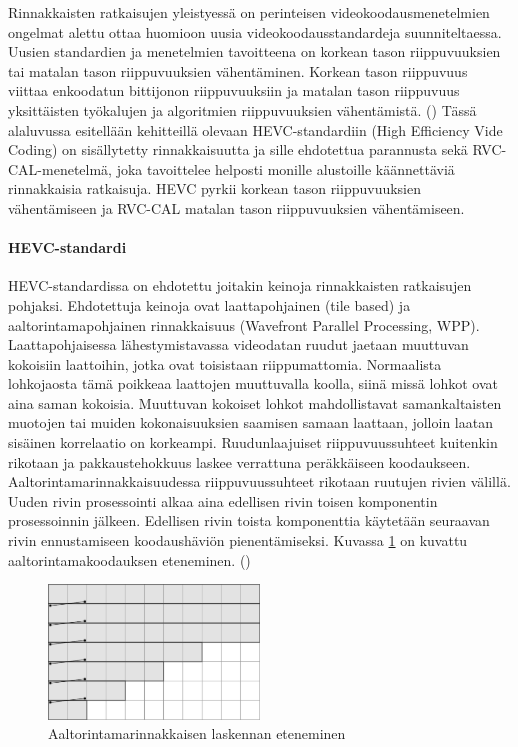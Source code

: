 Rinnakkaisten ratkaisujen yleistyessä on perinteisen videokoodausmenetelmien
ongelmat alettu ottaa huomioon uusia
videokoodausstandardeja suunniteltaessa. Uusien standardien ja menetelmien tavoitteena on korkean
tason riippuvuuksien tai matalan tason riippuvuuksien vähentäminen. Korkean
tason riippuvuus viittaa enkoodatun bittijonon riippuvuuksiin ja matalan
tason riippuvuus yksittäisten työkalujen ja algoritmien riippuvuuksien
vähentämistä. (\citealt{choi}) Tässä alaluvussa esitellään kehitteillä
olevaan HEVC-standardiin (High Efficiency Vide Coding) on sisällytetty rinnakkaisuutta ja sille ehdotettua
parannusta sekä RVC-CAL-menetelmä, joka tavoittelee helposti monille alustoille
käännettäviä rinnakkaisia ratkaisuja. HEVC pyrkii korkean tason riippuvuuksien
vähentämiseen ja RVC-CAL matalan tason riippuvuuksien vähentämiseen.

\setcounter{secnumdepth}{5}

\paragraph{HEVC-standardi}
HEVC-standardissa on ehdotettu joitakin keinoja rinnakkaisten
ratkaisujen pohjaksi. Ehdotettuja keinoja ovat laattapohjainen (tile based) ja
aaltorintamapohjainen rinnakkaisuus (Wavefront Parallel Processing, WPP).
Laattapohjaisessa lähestymistavassa videodatan ruudut jaetaan muuttuvan
kokoisiin laattoihin, jotka ovat toisistaan riippumattomia. Normaalista
lohkojaosta tämä poikkeaa laattojen muuttuvalla koolla, siinä missä lohkot
ovat aina saman kokoisia. Muuttuvan kokoiset lohkot mahdollistavat
samankaltaisten muotojen tai muiden kokonaisuuksien saamisen samaan laattaan,
jolloin laatan sisäinen korrelaatio on korkeampi. Ruudunlaajuiset
riippuvuussuhteet kuitenkin rikotaan ja pakkaustehokkuus laskee verrattuna
peräkkäiseen koodaukseen. Aaltorintamarinnakkaisuudessa riippuvuussuhteet
rikotaan ruutujen rivien välillä. Uuden rivin prosessointi alkaa aina edellisen
rivin toisen komponentin prosessoinnin jälkeen. Edellisen rivin toista
komponenttia käytetään seuraavan rivin ennustamiseen koodaushäviön
pienentämiseksi. Kuvassa \ref{fig:wpp} on kuvattu aaltorintamakoodauksen
eteneminen. (\citealt{chi})

\begin{figure}[ht]
	\centering
	\includegraphics[width=0.5\textwidth]{WPP.jpg}
	\caption{Aaltorintamarinnakkaisen laskennan eteneminen}
	\label{fig:wpp}
\end{figure}

